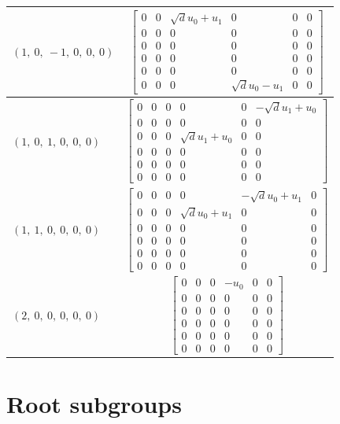 \documentclass[11pt]{article}
\theoremstyle{definition}
\begin{document}
\begin{longtable}{|l|c|}
    \hline
    $\left( 1, \  0, \  -1, \  0, \  0, \  0\right)$ & ${\left[\begin{matrix}0 & 0 & \sqrt{d} u_{0} + u_{1} & 0 & 0 & 0\\0 & 0 & 0 & 0 & 0 & 0\\0 & 0 & 0 & 0 & 0 & 0\\0 & 0 & 0 & 0 & 0 & 0\\0 & 0 & 0 & 0 & 0 & 0\\0 & 0 & 0 & \sqrt{d} u_{0} - u_{1} & 0 & 0\end{matrix}\right]}$ \\
    \hline
    $\left( 1, \  0, \  1, \  0, \  0, \  0\right)$ & ${\left[\begin{matrix}0 & 0 & 0 & 0 & 0 & - \sqrt{d} u_{1} + u_{0}\\0 & 0 & 0 & 0 & 0 & 0\\0 & 0 & 0 & \sqrt{d} u_{1} + u_{0} & 0 & 0\\0 & 0 & 0 & 0 & 0 & 0\\0 & 0 & 0 & 0 & 0 & 0\\0 & 0 & 0 & 0 & 0 & 0\end{matrix}\right]}$ \\
    \hline
    $\left( 1, \  1, \  0, \  0, \  0, \  0\right)$ & ${\left[\begin{matrix}0 & 0 & 0 & 0 & - \sqrt{d} u_{0} + u_{1} & 0\\0 & 0 & 0 & \sqrt{d} u_{0} + u_{1} & 0 & 0\\0 & 0 & 0 & 0 & 0 & 0\\0 & 0 & 0 & 0 & 0 & 0\\0 & 0 & 0 & 0 & 0 & 0\\0 & 0 & 0 & 0 & 0 & 0\end{matrix}\right]}$ \\
    \hline
    $\left( 2, \  0, \  0, \  0, \  0, \  0\right)$ & ${\left[\begin{matrix}0 & 0 & 0 & - u_{0} & 0 & 0\\0 & 0 & 0 & 0 & 0 & 0\\0 & 0 & 0 & 0 & 0 & 0\\0 & 0 & 0 & 0 & 0 & 0\\0 & 0 & 0 & 0 & 0 & 0\\0 & 0 & 0 & 0 & 0 & 0\end{matrix}\right]}$ \\
    \hline
\end{longtable}


\newpage
\section{Root subgroups}
\end{document}

